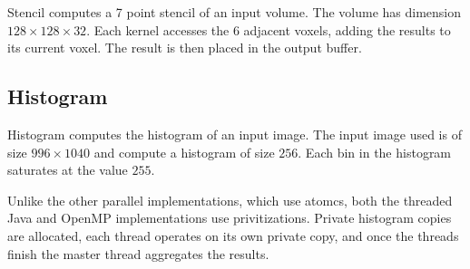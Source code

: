 Stencil computes a 7 point stencil of an input volume. 
The volume has dimension $128 \times 128 \times 32$.
Each kernel accesses the $6$ adjacent voxels, adding the results
	to its current voxel.
The result is then placed in the output buffer.

\subsection{Histogram}

Histogram computes the histogram of an input image.
The input image used is of size $996 \times 1040$ and compute a 
	histogram of size $256$.
Each bin in the histogram saturates at the value $255$.

Unlike the other parallel implementations, which use atomcs, both the
	threaded Java and OpenMP implementations use privitizations.
Private histogram copies are allocated, each thread 
	operates on its own private copy, and once the threads finish the
	master thread aggregates the results.

